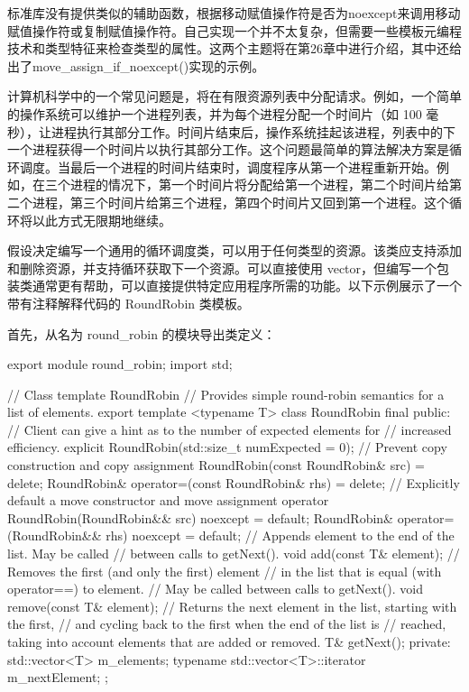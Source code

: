 标准库没有提供类似的辅助函数，根据移动赋值操作符是否为noexcept来调用移动赋值操作符或复制赋值操作符。自己实现一个并不太复杂，但需要一些模板元编程技术和类型特征来检查类型的属性。这两个主题将在第26章中进行介绍，其中还给出了move\_assign\_if\_noexcept()实现的示例。


计算机科学中的一个常见问题是，将在有限资源列表中分配请求。例如，一个简单的操作系统可以维护一个进程列表，并为每个进程分配一个时间片（如 100 毫秒），让进程执行其部分工作。时间片结束后，操作系统挂起该进程，列表中的下一个进程获得一个时间片以执行其部分工作。这个问题最简单的算法解决方案是循环调度。当最后一个进程的时间片结束时，调度程序从第一个进程重新开始。例如，在三个进程的情况下，第一个时间片将分配给第一个进程，第二个时间片给第二个进程，第三个时间片给第三个进程，第四个时间片又回到第一个进程。这个循环将以此方式无限期地继续。

假设决定编写一个通用的循环调度类，可以用于任何类型的资源。该类应支持添加和删除资源，并支持循环获取下一个资源。可以直接使用 vector，但编写一个包装类通常更有帮助，可以直接提供特定应用程序所需的功能。以下示例展示了一个带有注释解释代码的 RoundRobin 类模板。

首先，从名为 round\_robin 的模块导出类定义：

\begin{cpp}
export module round_robin;
import std;

// Class template RoundRobin
// Provides simple round-robin semantics for a list of elements.
export template <typename T>
class RoundRobin final
{
    public:
        // Client can give a hint as to the number of expected elements for
        // increased efficiency.
        explicit RoundRobin(std::size_t numExpected = 0);
        // Prevent copy construction and copy assignment
        RoundRobin(const RoundRobin& src) = delete;
        RoundRobin& operator=(const RoundRobin& rhs) = delete;
        // Explicitly default a move constructor and move assignment operator
        RoundRobin(RoundRobin&& src) noexcept = default;
        RoundRobin& operator=(RoundRobin&& rhs) noexcept = default;
        // Appends element to the end of the list. May be called
        // between calls to getNext().
        void add(const T& element);
        // Removes the first (and only the first) element
        // in the list that is equal (with operator==) to element.
        // May be called between calls to getNext().
        void remove(const T& element);
        // Returns the next element in the list, starting with the first,
        // and cycling back to the first when the end of the list is
        // reached, taking into account elements that are added or removed.
        T& getNext();
    private:
        std::vector<T> m_elements;
        typename std::vector<T>::iterator m_nextElement;
};
\end{cpp}

